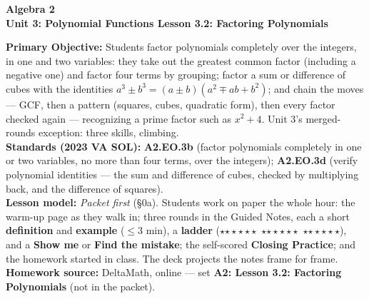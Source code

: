 \documentclass[10pt]{article}
\newcommand{\CourseName}{Algebra 2}
\newcommand{\UnitNumberName}{Unit 3: Polynomial Functions \quad}
\newcommand{\LessonNumberName}{Lesson 3.2: Factoring Polynomials}
\newcommand{\rung}[1]{{\color{goldacc}\ifcase#1\or$\star$\or$\star\star$\or$\star\star\star$\fi}}
\begin{document}
\begin{center}
    {\Large\bfseries \CourseName \\
    {\small\bfseries \UnitNumberName \LessonNumberName}}
\end{center}

\begin{tcolorbox}[colback=forestbg, colframe=forest, boxrule=0.9pt, arc=2mm,
    left=2mm, right=2mm, top=1.5mm, bottom=1.5mm]
    \textbf{Primary Objective:} Students factor polynomials completely over the integers, in one
    and two variables: they take out the greatest common factor (including a negative one) and
    factor four terms by grouping; factor a sum or difference of cubes with the identities
    $a^3\pm b^3=(a\pm b)(a^2\mp ab+b^2)$; and chain the moves --- GCF, then a pattern (squares,
    cubes, quadratic form), then every factor checked again --- recognizing a prime factor such as
    $x^2+4$. Unit 3's merged-rounds exception: three skills, climbing.
    \\[2pt]
    \textbf{Standards (2023 VA SOL):} \textbf{A2.EO.3b} (factor polynomials completely in one or
    two variables, no more than four terms, over the integers); \textbf{A2.EO.3d} (verify
    polynomial identities --- the sum and difference of cubes, checked by multiplying back, and
    the difference of squares).
    \\[2pt]
    \textbf{Lesson model:} \emph{Packet first} (§0a). Students work on paper the whole hour: the
    warm-up page as they walk in; three rounds in the Guided Notes, each a short
    \textbf{definition} and \textbf{example} ($\le$3 min), a \textbf{ladder} (\rung1\ \rung2\
    \rung3), and a \textbf{Show me} or \textbf{Find the mistake}; the self-scored
    \textbf{Closing Practice}; and the homework started in class. The deck projects the notes
    frame for frame.
    \textbf{Homework source:} DeltaMath, online --- set \textbf{A2: Lesson 3.2: Factoring
    Polynomials} (not in the packet).
\end{tcolorbox}
\end{document}
